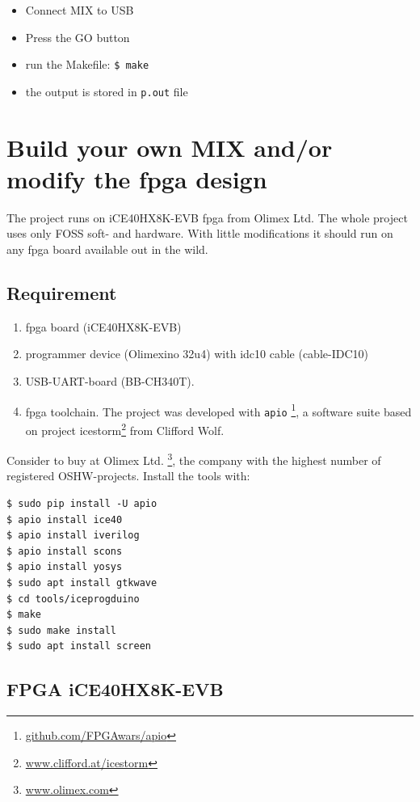 \documentclass[a4paper,ngerman]{scrartcl}
\begin{document}
\begin{itemize}
	\item Connect MIX to USB
	\item Press the GO button
	\item run the Makefile: \lstinline|$ make|
	\item the output is stored in \lstinline|p.out| file
\end{itemize}


\section{Build your own MIX and/or modify the fpga design}

The project runs on iCE40HX8K-EVB fpga from Olimex Ltd. The whole project uses only FOSS soft- and hardware. With little modifications it should run on any fpga board available out in the wild.

\subsection{Requirement}
\begin{enumerate}
	\item 
	fpga board (iCE40HX8K-EVB)
	\item programmer device (Olimexino 32u4) with idc10 cable (cable-IDC10)
	\item USB-UART-board (BB-CH340T).  
	\item fpga toolchain. The project was developed with \lstinline|apio| \footnote{\href{github.com/FPGAwars/apio}{github.com/FPGAwars/apio}}, a software suite based on project icestorm\footnote{\href{www.clifford.at/icestorm}{www.clifford.at/icestorm}} from Clifford Wolf.
\end{enumerate}

Consider to buy at Olimex Ltd. \footnote{\href{www.olimex.com}{www.olimex.com}}, the company with the highest number of registered OSHW-projects. Install the tools with:

\begin{lstlisting}[numbers=none,frame=none]
$ sudo pip install -U apio
$ apio install ice40
$ apio install iverilog
$ apio install scons
$ apio install yosys
$ sudo apt install gtkwave
$ cd tools/iceprogduino
$ make
$ sudo make install
$ sudo apt install screen
\end{lstlisting}

\subsection{FPGA iCE40HX8K-EVB}
\end{document}
